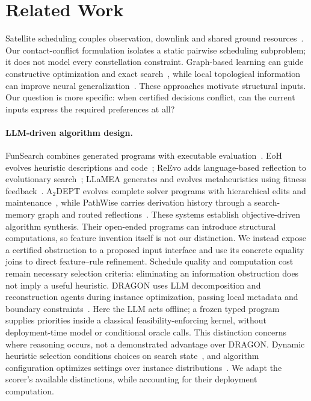 \section{Related Work}
\label{sec:related}

Satellite scheduling couples observation, downlink and shared ground
resources~\cite{augenstein2016optimal,levinson2025optimal,picard2021constellations}.
Our contact-conflict formulation isolates a static pairwise scheduling
subproblem; it does not model every constellation constraint. Graph-based
learning can guide constructive optimization and exact
search~\cite{khalil2017learning,li2018gcn,gasse2019exact}, while local
topological information can improve neural generalization~\cite{bai2025local}.
These approaches motivate structural inputs. Our question is more specific:
when certified decisions conflict, can the current inputs express the
required preferences at all?

\paragraph{LLM-driven algorithm design.}
FunSearch combines generated programs with executable evaluation~\cite{romeraparedes2024funsearch}.
EoH evolves heuristic descriptions and code~\cite{liu2024eoh}; ReEvo adds
language-based reflection to evolutionary search~\cite{ye2024reevo}; LLaMEA
generates and evolves metaheuristics using fitness feedback~\cite{vanstein2025llamea}.
A$_2$DEPT evolves complete solver programs with hierarchical edits and
maintenance~\cite{chen2026a2dept}, while PathWise carries derivation history
through a search-memory graph and routed reflections~\cite{gungordu2026pathwise}.
These systems establish objective-driven algorithm synthesis. Their
open-ended programs can introduce structural computations, so feature
invention itself is not our distinction. We instead expose a certified
obstruction to a proposed input interface and use its concrete equality
joins to direct feature--rule refinement. Schedule quality and computation
cost remain necessary selection criteria: eliminating an information
obstruction does not imply a useful heuristic. DRAGON uses LLM decomposition
and reconstruction agents during instance optimization, passing local
metadata and boundary constraints~\cite{chen2026dragon}. Here the LLM acts
offline; a frozen typed program supplies priorities inside a classical
feasibility-enforcing kernel, without deployment-time model or conditional
oracle calls. This distinction concerns where reasoning occurs, not a
demonstrated advantage over DRAGON.
Dynamic heuristic selection conditions choices on search
state~\cite{speck2021dynamic}, and algorithm configuration optimizes settings
over instance distributions~\cite{hutter2009paramils}. We adapt the scorer's
available distinctions, while accounting for their deployment computation.

